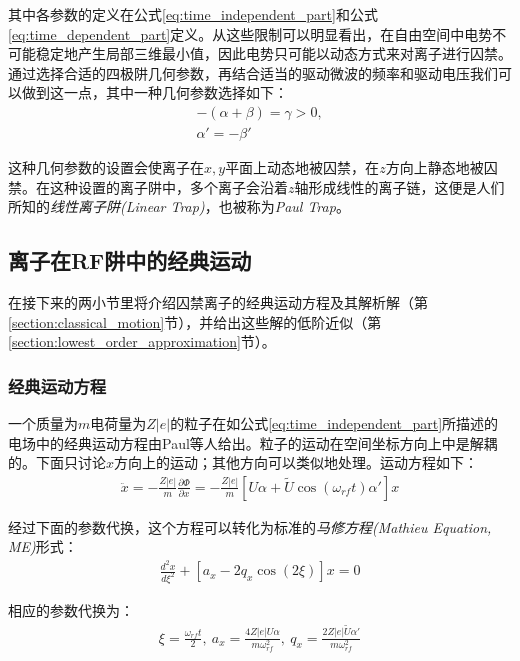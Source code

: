 其中各参数的定义在公式\eqref{eq:time_independent_part}和公式\eqref{eq:time_dependent_part}定义。从这些限制可以明显看出，在自由空间中电势不可能稳定地产生局部三维最小值，因此电势只可能以动态方式来对离子进行囚禁。通过选择合适的四极阱几何参数，再结合适当的驱动微波的频率和驱动电压我们可以做到这一点，其中一种几何参数选择如下：
\begin{align}
    -(\alpha + \beta )= \gamma > 0,\\
    \alpha ' = - \beta '
\end{align}

这种几何参数的设置会使离子在$x,y$平面上动态地被囚禁，在$z$方向上静态地被囚禁。在这种设置的离子阱中，多个离子会沿着$z$轴形成线性的离子链，这便是人们所知的\emph{线性离子阱(Linear Trap)}，也被称为\emph{Paul Trap}\cite[]{Paul_1990}。


\subsection[离子在RF阱中的经典运动]{离子在RF阱中的经典运动\label{section:ion_classical_motion}}

在接下来的两小节里将介绍囚禁离子的经典运动方程及其解析解（第\ref{section:classical_motion}节），并给出这些解的低阶近似（第\ref{section:lowest_order_approximation}节）。

\subsubsection[经典运动方程]{经典运动方程\label{section:classical_motion}}

一个质量为$m$电荷量为$Z|e|$的粒子在如公式\eqref{eq:time_independent_part}所描述的电场中的经典运动方程由Paul等人\cite[p415]{Paul1958}给出。粒子的运动在空间坐标方向上中是解耦的。下面只讨论$x$方向上的运动；其他方向可以类似地处理。运动方程如下：
\begin{align}
    \ddot{x}=-\frac{Z|e|}{m}\frac{\partial \Phi}{\partial x}=-\frac{Z|e|}{m}[U\alpha + \tilde{U}\cos(\omega_{rf}t)\alpha ']x
\end{align}

经过下面的参数代换，这个方程可以转化为标准的\emph{马修方程(Mathieu Equation, ME)}形式：
\begin{align}
    \frac{d^2x}{d\xi^2}+[a_x-2q_x\cos(2\xi)]x=0\label{eq:mathieu_equation}
\end{align}

相应的参数代换为：
\begin{align}
    \xi=\frac{\omega_{rf}t}{2},\ a_x=\frac{4Z|e|U\alpha}{m\omega_{rf}^2},\ q_x=\frac{2Z|e|\tilde{U}\alpha '}{m\omega_{rf}^2}\label{eq:parameters_substitution}
\end{align}

